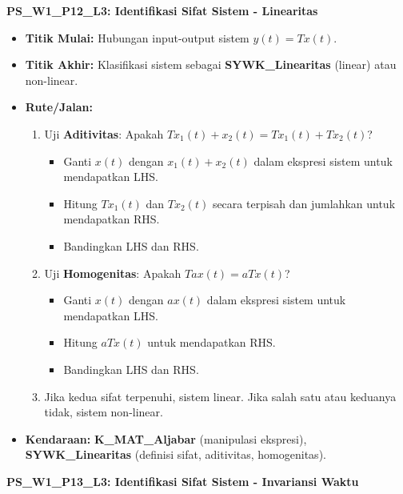 \documentclass[
  letterpaper,
  DIV=11,
  numbers=noendperiod]{scrreprt}
\providecommand{\tightlist}{%
  \setlength{\itemsep}{0pt}\setlength{\parskip}{0pt}}
\begin{document}
\textbf{PS\_W1\_P12\_L3: Identifikasi Sifat Sistem - Linearitas}

\begin{itemize}
\tightlist
\item
  \textbf{Titik Mulai:} Hubungan input-output sistem \(y(t) = T{x(t)}\).
\item
  \textbf{Titik Akhir:} Klasifikasi sistem sebagai
  \textbf{SYWK\_Linearitas} (linear) atau non-linear.
\item
  \textbf{Rute/Jalan:}

  \begin{enumerate}
  \def\labelenumi{\arabic{enumi}.}
  \tightlist
  \item
    Uji \textbf{Aditivitas}: Apakah
    \(T{x_1(t) + x_2(t)} = T{x_1(t)} + T{x_2(t)}\)?

    \begin{itemize}
    \tightlist
    \item
      Ganti \(x(t)\) dengan \(x_1(t) + x_2(t)\) dalam ekspresi sistem
      untuk mendapatkan LHS.
    \item
      Hitung \(T{x_1(t)}\) dan \(T{x_2(t)}\) secara terpisah dan
      jumlahkan untuk mendapatkan RHS.
    \item
      Bandingkan LHS dan RHS.
    \end{itemize}
  \item
    Uji \textbf{Homogenitas}: Apakah \(T{a x(t)} = a T{x(t)}\)?

    \begin{itemize}
    \tightlist
    \item
      Ganti \(x(t)\) dengan \(a x(t)\) dalam ekspresi sistem untuk
      mendapatkan LHS.
    \item
      Hitung \(a T{x(t)}\) untuk mendapatkan RHS.
    \item
      Bandingkan LHS dan RHS.
    \end{itemize}
  \item
    Jika kedua sifat terpenuhi, sistem linear. Jika salah satu atau
    keduanya tidak, sistem non-linear.
  \end{enumerate}
\item
  \textbf{Kendaraan:} \textbf{K\_MAT\_Aljabar} (manipulasi ekspresi),
  \textbf{SYWK\_Linearitas} (definisi sifat, aditivitas, homogenitas).
\end{itemize}

\textbf{PS\_W1\_P13\_L3: Identifikasi Sifat Sistem - Invariansi Waktu}
\end{document}
